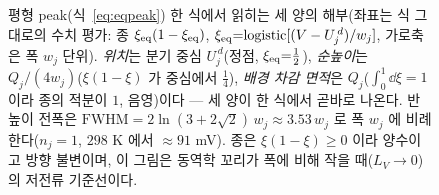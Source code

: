 \begin{figure}[t]
\caption{평형 peak(식~\eqref{eq:eqpeak}) 한 식에서 읽히는 세 양의 해부(좌표는 식 그대로의 수치 평가: 종
$\xi_{\mathrm{eq}}(1-\xi_{\mathrm{eq}})$, $\xi_{\mathrm{eq}}{=}\mathrm{logistic}[(V-U_j^{\,d})/w_j]$, 가로축은 폭 $w_j$ 단위). \emph{위치}는 분기
중심 $U_j^{\,d}$(정점, $\xi_{\mathrm{eq}}{=}\tfrac12$), \emph{순높이}는 $Q_j/(4w_j)$($\xi(1-\xi)$ 가 중심에서 $\tfrac14$),
\emph{배경 차감 면적}은 $Q_j$($\int_0^1\dd\xi{=}1$ 이라 종의 적분이 $1$, 음영)이다 --- 세 양이 한 식에서 곧바로
나온다. 반높이 전폭은 $\mathrm{FWHM}=2\ln(3+2\sqrt2)\,w_j\approx3.53\,w_j$ 로 폭 $w_j$ 에 비례한다($n_j{=}1$,
$298$ K 에서 $\approx91$ mV). 종은 $\xi(1-\xi)\ge0$ 이라 양수이고 방향 불변이며, 이 그림은 동역학 꼬리가 폭에
비해 작을 때($L_V\!\to\!0$)의 저전류 기준선이다.}
\label{fig:cand-fo3-3}
\end{figure}
